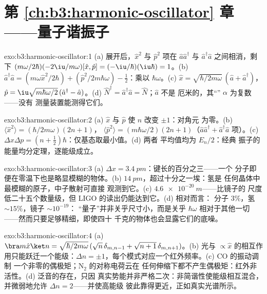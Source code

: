 \section*{第 \ref{ch:b3:harmonic-oscillator} 章——量子谐振子}

\begin{solution}{exo:b3:harmonic-oscillator:1}
(a) 展开后，$\hat x^2$ 与 $\hat p^2$ 项在
$\hat a\hat a^\dagger$ 与 $\hat a^\dagger\hat a$ 之间相消，剩下
$(m\omega/2\hbar)(-2\iu/m\omega)[\hat x, \hat p] =
(-\iu/\hbar)(\iu\hbar) = 1$。(b) $\hat a^\dagger\hat a = (m\omega\hat x^2/2\hbar) +
(\hat p^2/2m\hbar\omega) - \tfrac12$：乘以 $\hbar\omega$。(c)
$\hat x = \sqrt{\hbar/2m\omega}\,(\hat a + \hat a^\dagger)$，$\hat p
= \iu\sqrt{m\hbar\omega/2}\,(\hat a^\dagger - \hat a)$。(d) $\hat
N^\dagger = \hat a^\dagger\hat a = \hat N$；$\hat a$ 不是
厄米的，其“” $\alpha$ 为复数——没有
测量装置能测得它们。
\end{solution}

\begin{solution}{exo:b3:harmonic-oscillator:2}
(a) $\hat x$ 与 $\hat p$ 使 $n$ 改变 $\pm1$：对角元
为零。(b) $\langle\hat x^2\rangle = (\hbar/2m\omega)(2n + 1)$，
$\langle\hat p^2\rangle = (m\hbar\omega/2)(2n + 1)$（$\hat
a\hat a^\dagger + \hat a^\dagger\hat a$ 项）。(c) $\Delta x\Delta p
= (n + \tfrac12)\hbar$：仅基态取最小值。(d) 两者
平均值均为 $E_n/2$：经典
振子的能量均分定理，逐能级成立。
\end{solution}

\begin{solution}{exo:b3:harmonic-oscillator:3}
(a) $\Delta x = \qty{3.4}{pm}$：键长的百分之三——一个
分子即便在零温下也是略显模糊的物体。(b)
$\qty{14}{pm}$，超过十分之一埃：氢是
任何晶体中最模糊的原子，中子散射可直接
观测到它。(c) $\qty{4.6e-20}{m}$——比镜子的
尺度低二十五个数量级，但 LIGO 的读出仍能达到它。(d) 相对而言：
分子 $3\%$，氢 $\sim15\%$，镜子 $\sim10^{-19}$：
“量子”并非关乎尺寸小，而是关乎 $\hbar\omega$
相对于其他一切——然而只要足够精细，即使四十
千克的物体也会显露它们的底噪。
\end{solution}

\begin{solution}{exo:b3:harmonic-oscillator:4}
(a) $\bra m\hat x\ket n = \sqrt{\hbar/2m\omega}\,(\sqrt n\,
\delta_{m,n-1} + \sqrt{n + 1}\,\delta_{m,n+1})$。(b) 光与
$\propto\hat x$ 的相互作用只能跃迁一个能级：$\Delta n =
\pm1$，每个模式对应一个红外频率。(c) CO 的振动调制
一个非零的偶极矩；N$_2$ 的对称电荷云在
任何伸缩下都不产生偶极矩：红外非活性。(d) 泛音的存在，只因
真实势能并非严格二次：非简谐性使能级相互混合，
并微弱地允许 $\Delta n = 2$——并使高能级
彼此靠得更近，正如真实光谱所示。
\end{solution}

